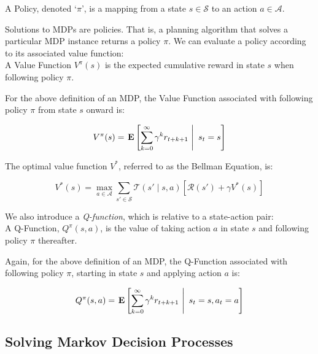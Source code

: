 \documentclass[11pt]{article}
\begin{document}
{ A \textup{Policy}, denoted `$\pi$', is a mapping from a state $s \in \mathcal{S}$ to an action $a \in \mathcal{A}$.}

Solutions to MDPs are policies. That is, a planning algorithm that solves a particular MDP instance returns a policy $\pi$. We can evaluate a policy according to its associated value function: \\

{ A \textup{Value Function} $V^\pi(s)$ is the expected cumulative reward in state $s$ when following policy $\pi$.}

For the above definition of an MDP, the Value Function associated with following policy $\pi$ from state $s$ onward is:

\begin{equation}
V^\pi(s) = \left.{\bf E} \left[ \sum_{k=0}^\infty \gamma^k r_{t+k+1}\ \right|\ s_t = s \right]
\end{equation}

{ The \textup{optimal value function} $V^*$, referred to as the Bellman Equation, is:

\begin{equation}
V^*(s) = \max_{a \in \mathcal{A}} \sum_{s' \in \mathcal{S}} \mathcal{T}(s' \mid s, a) \left[\mathcal{R}(s') + \gamma V^*(s) \right]
\label{eq:bellman_equation}
\end{equation}}

We also introduce a {\it Q-function}, which is relative to a state-action pair: \\

{ A \textup{Q-Function}, $Q^\pi(s,a)$, is the value of taking action $a$ in state $s$ and following policy $\pi$ thereafter}.

Again, for the above definition of an MDP, the Q-Function associated with following policy $\pi$, starting in state $s$ and applying action $a$ is:

\begin{equation}
Q^\pi(s,a) = \left.{\bf E} \left[ \sum_{k=0}^\infty \gamma^k r_{t+k+1}\ \right|\ s_t = s, a_t = a \right]
\end{equation}





\subsection{Solving Markov Decision Processes}
\end{document}
